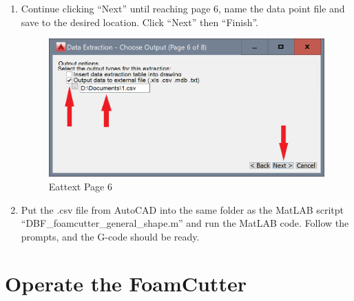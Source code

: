 \documentclass[titlepage,12pt,letter]{report}
\numberwithin{equation}{chapter}
\begin{document}
\begin{enumerate}[noitemsep,topsep=0pt]
	\item Continue clicking ``Next'' until reaching page 6, name the data point file and save to the desired location. Click ``Next'' then ``Finish''.
	\begin{figure} [H]
		\includegraphics[width = 0.6\linewidth]{./Figures/general_shape/cad9.png}
		\caption{Eattext Page 6}
	\end{figure}
	
	\item Put the .csv file from AutoCAD into the same folder as the MatLAB scritpt ``DBF\_foamcutter\_general\_shape.m'' and run the MatLAB code. Follow the prompts, and the G-code should be ready.
	
	
\end{enumerate}

\newpage




\newpage
\chapter{Operate the FoamCutter}
\end{document}
